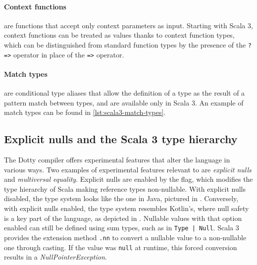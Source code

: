 \paragraph{Context functions} are functions that accept only context parameters as input.
%
Starting with Scala 3, context functions can be treated as values thanks to context function types, which can be distinguished from standard function types by the presence of the \texttt{?=>} operator in place of the \texttt{=>} operator.

\paragraph{Match types} are conditional type aliases that allow the definition of a type as the result of a pattern match between types, and are available only in Scala 3.
%
An example of match types can be found in \cref{lst:scala3-match-types}.




\subsection{Explicit nulls and the Scala 3 type hierarchy} \label{chap:background->sec:scala3->subsec:type-hierarchy} \label{chap:background->sec:scala3->subsec:explicit-nulls}

The Dotty compiler offers experimental features that alter the language in various ways.
%
Two examples of experimental features relevant to \this are \textit{explicit nulls} and \textit{multiversal equality}.
%
Explicit nulls are enabled by the  flag, which modifies the type hierarchy of Scala making reference types non-nullable.
%
With explicit nulls disabled, the type system looks like the one in Java, pictured in .
%
Conversely, with explicit nulls enabled, the type system resembles Kotlin's, where null safety is a key part of the language, as depicted in .
%
Nullable values with that option enabled can still be defined using sum types, such as in \texttt{Type | Null}.
%
Scala 3 provides the extension method \texttt{.nn} to convert a nullable value to a non-nullable one through casting.
%
If the value was \texttt{null} at runtime, this forced conversion results in a \textit{NullPointerException}.

